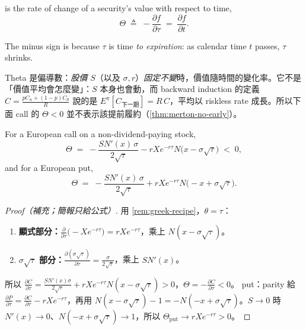
\begin{definition}
	 is the rate of change of a security's value with respect to time,
	\[
		\Theta \;\triangleq\; -\frac{\partial f}{\partial\tau} \;=\; \frac{\partial f}{\partial t} .
	\]
\end{definition}

\suppstart
The minus sign is because $\tau$ is time \emph{to expiration}: as calendar time $t$ passes, $\tau$ shrinks.


\begin{remark}
	Theta 是偏導數：\emph{股價 $S$}（以及 $\sigma,r$）\emph{固定不變}時，價值隨時間的變化率。它不是「價值平均會怎麼變」：$S$ 本身也會動，而 backward induction 的定義 $C=\frac{pC_{u}+(1-p)C_{d}}{R}$ 說的是 $E^{\pi}[C_{\text{下一期}}]=R\,C$，平均以 riskless rate 成長。所以下面 call 的 $\Theta<0$ 並不表示該提前履約（\autoref{thm:merton-no-early}）。
\end{remark}
\suppend

\begin{proposition}
	For a European call on a non-dividend-paying stock,
	\[
		\Theta \;=\; -\frac{SN'(x)\,\sigma}{2\sqrt{\tau}}-rXe^{-r\tau}N\bigl(x-\sigma\sqrt{\tau}\bigr) \;<\; 0 ,
	\]
	and for a European put,
	\[
		\Theta \;=\; -\frac{SN'(x)\,\sigma}{2\sqrt{\tau}}+rXe^{-r\tau}N\bigl(-x+\sigma\sqrt{\tau}\bigr) .
	\]
\end{proposition}

\suppstart
{}

\begin{proof}[Proof（補充；簡報只給公式）]
	用 \autoref{rem:greek-recipe}，$\theta=\tau$：
	\begin{enumerate}[(1),nosep]
		\item \textbf{顯式部分：}$\frac{\partial}{\partial\tau}\bigl(-Xe^{-r\tau}\bigr)=rXe^{-r\tau}$，乘上 $N(x-\sigma\sqrt{\tau})$。
		\item \textbf{$\sigma\sqrt{\tau}$ 部分：}$\frac{\partial(\sigma\sqrt{\tau})}{\partial\tau}=\frac{\sigma}{2\sqrt{\tau}}$，乘上 $SN'(x)$。
	\end{enumerate}
	所以 $\frac{\partial C}{\partial\tau}=\frac{SN'(x)\sigma}{2\sqrt{\tau}}+rXe^{-r\tau}N(x-\sigma\sqrt{\tau})>0$，$\Theta=-\frac{\partial C}{\partial\tau}<0$。
	put：parity 給 $\frac{\partial P}{\partial\tau}=\frac{\partial C}{\partial\tau}-rXe^{-r\tau}$，再用 $N(x-\sigma\sqrt{\tau})-1=-N(-x+\sigma\sqrt{\tau})$。$S\to0$ 時 $N'(x)\to0$、$N(-x+\sigma\sqrt{\tau})\to1$，所以 $\Theta_{\text{put}}\to rXe^{-r\tau}>0$。
\end{proof}
\suppend

